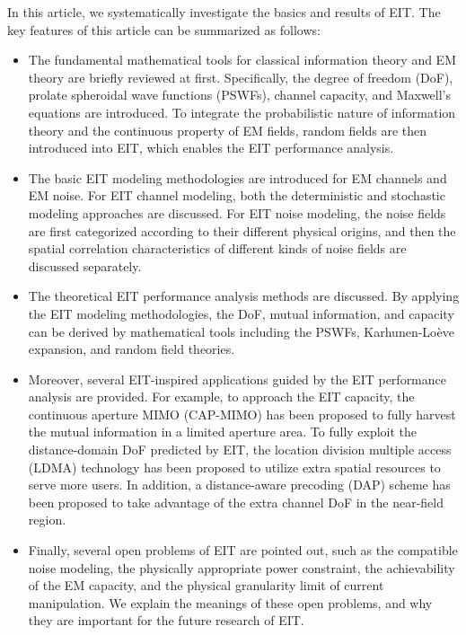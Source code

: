 \documentclass[journal,twocolumn]{IEEEtran}
\begin{document}
In this article, we systematically investigate the basics and results of EIT. The key features of this article can be summarized as follows:
\begin{itemize}
\item{The fundamental mathematical tools for classical information theory and EM theory are briefly reviewed at first. Specifically, the degree of freedom (DoF), prolate spheroidal wave functions (PSWFs), channel capacity, and Maxwell's equations are introduced. To integrate the probabilistic nature of information theory and the continuous property of EM fields, random fields are then introduced into EIT, which enables the EIT performance analysis. }
\item{The basic EIT modeling methodologies are introduced for EM channels and EM noise. For EIT channel modeling, both the deterministic and stochastic modeling approaches are discussed. For EIT noise modeling, the noise fields are first categorized according to their different physical origins, and then the spatial correlation characteristics of different kinds of noise fields are discussed separately. }
\item{The theoretical EIT performance analysis methods are discussed. By applying the EIT modeling methodologies, the DoF, mutual information, and capacity can be derived by mathematical tools including the PSWFs, Karhunen-Lo\`{e}ve expansion, and random field theories. } 
\item Moreover, several EIT-inspired applications guided by the EIT performance analysis are provided. For example, to approach the EIT capacity, the continuous aperture MIMO (CAP-MIMO) has been proposed to fully harvest the mutual information in a limited aperture area. To fully exploit the distance-domain DoF predicted by EIT, the location division multiple access (LDMA) technology has been proposed to utilize extra spatial resources to serve more users. In addition, a distance-aware precoding (DAP) scheme has been proposed to take advantage of the extra channel DoF in the near-field region.  %
\item{Finally, several open problems of EIT are pointed out, such as the compatible noise modeling, the physically appropriate power constraint, the achievability of the EM capacity, and the physical granularity limit of current manipulation. We explain the meanings of these open problems, and why they are important for the future research of EIT. }
\end{itemize}
\end{document}
